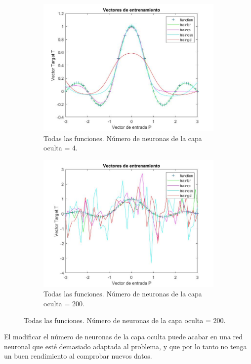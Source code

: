 \documentclass{article}
\begin{document}
\begin{figure}
 \centering
 \begin{subfigure}{0.45\textwidth}
  \includegraphics[width=0.9\linewidth]{../images/I_ex2_training_functions.jpg}
  \caption{Todas las funciones. Número de neuronas de la capa oculta = 4.}
  \label{f4}
 \end{subfigure}
 \begin{subfigure}{0.45\textwidth}
  \includegraphics[width=0.9\linewidth]{../images/I_ex2_training_functions_200.jpg}
  \caption{Todas las funciones. Número de neuronas de la capa oculta = 200.}
  \label{f200}
 \end{subfigure}
\end{figure}

El modificar el número de neuronas de la capa oculta puede acabar en una red
neuronal que esté demasiado adaptada al problema, y que por lo tanto no tenga un
buen rendimiento al comprobar nuevos datos.
\end{document}
